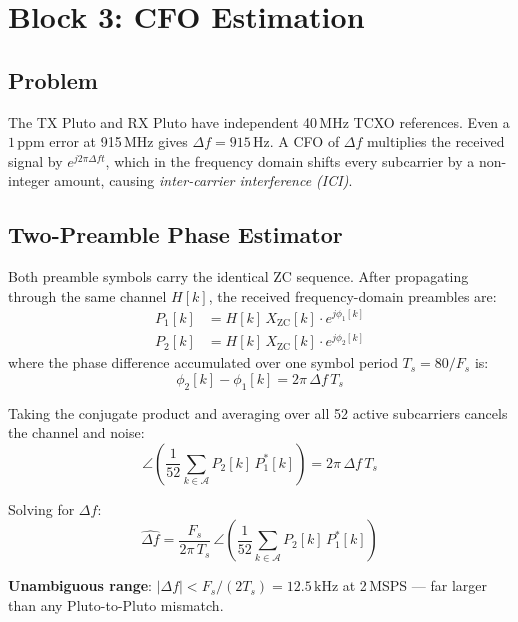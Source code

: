 \documentclass[11pt,a4paper]{article}
\begin{document}
\section{Block 3: CFO Estimation}

\subsection{Problem}

The TX Pluto and RX Pluto have independent 40\,MHz TCXO references.
Even a $1\,\text{ppm}$ error at 915\,MHz gives $\Delta f = 915\,\text{Hz}$.
A CFO of $\Delta f$ multiplies the received signal by $e^{j2\pi\Delta f t}$,
which in the frequency domain shifts every subcarrier by a non-integer amount,
causing \emph{inter-carrier interference (ICI)}.

\subsection{Two-Preamble Phase Estimator}

Both preamble symbols carry the identical ZC sequence.  After propagating
through the same channel $H[k]$, the received frequency-domain preambles are:
\begin{align}
  P_1[k] &= H[k]\,X_{\text{ZC}}[k]\cdot e^{j\phi_1[k]} \\
  P_2[k] &= H[k]\,X_{\text{ZC}}[k]\cdot e^{j\phi_2[k]}
\end{align}
where the phase difference accumulated over one symbol period $T_s = 80/F_s$
is:
\begin{equation}
  \phi_2[k] - \phi_1[k] = 2\pi\,\Delta f\, T_s
\end{equation}

Taking the conjugate product and averaging over all 52 active subcarriers
cancels the channel and noise:
\begin{equation}
  \angle\!\left(\frac{1}{52}\sum_{k \in \mathcal{A}} P_2[k]\,P_1^*[k]\right)
  = 2\pi\,\Delta f\, T_s
\end{equation}

Solving for $\Delta f$:
\begin{equation}
  \boxed{\hat{\Delta f} = \frac{F_s}{2\pi\,T_s}\,
    \angle\!\left(\frac{1}{52}\sum_{k \in \mathcal{A}} P_2[k]\,P_1^*[k]\right)}
\end{equation}

\textbf{Unambiguous range}: $|\Delta f| < F_s/(2T_s) = 12.5\,\text{kHz}$ at
2\,MSPS --- far larger than any Pluto-to-Pluto mismatch.
\end{document}
